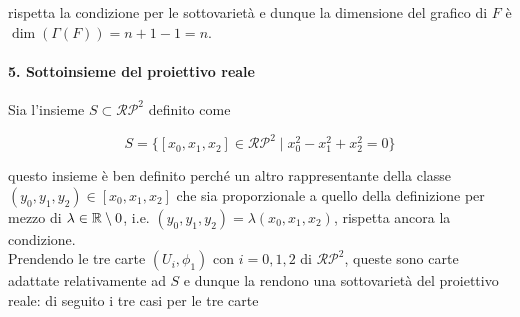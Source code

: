 rispetta la condizione per le sottovarietà e dunque la dimensione del grafico di $ F $ è $ \dim(\Gamma(F)) = n+1-1 = n $.

\paragraph{5. Sottoinsieme del proiettivo reale}

Sia l'insieme $ S \subset \mathcal{RP}^{2} $ definito come

\begin{equation}
	S = \{ [x_{0},x_{1},x_{2}] \in \mathcal{RP}^{2} \mid x_{0}^{2} - x_{1}^{2} + x_{2}^{2} = 0 \}
\end{equation}

questo insieme è ben definito perché un altro rappresentante della classe $ (y_{0},y_{1},y_{2}) \in [x_{0},x_{1},x_{2}] $ che sia proporzionale a quello della definizione per mezzo di $ \lambda \in \mathbb{R} \setminus 0 $, i.e. $ (y_{0},y_{1},y_{2}) = \lambda (x_{0},x_{1},x_{2}) $, rispetta ancora la condizione.\\
Prendendo le tre carte $ (U_{i},\phi_{1}) $ con $ i=0,1,2 $ di $ \mathcal{RP}^{2} $, queste sono carte adattate relativamente ad $ S $ e dunque la rendono una sottovarietà del proiettivo reale: di seguito i tre casi per le tre carte

